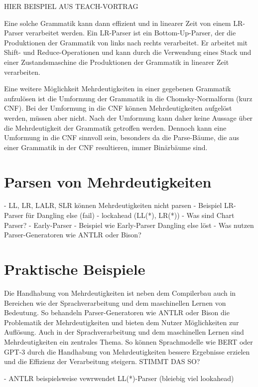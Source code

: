 \documentclass[runningheads]{llncs}
\begin{document}
	HIER BEISPIEL AUS TEACH-VORTRAG

	Eine solche Grammatik kann dann effizient und in linearer Zeit von einem LR-Parser verarbeitet werden.
	Ein LR-Parser ist ein Bottom-Up-Parser, der die Produktionen der Grammatik von links nach rechts verarbeitet.
	Er arbeitet mit Shift- und Reduce-Operationen und kann durch die Verwendung eines Stack und einer Zustandsmaschine
	die Produktionen der Grammatik in linearer Zeit verarbeiten.

	Eine weitere Möglichkeit Mehrdeutigkeiten in einer gegebenen Grammatik aufzulösen
	ist die Umformung der Grammatik in die Chomsky-Normalform (kurz CNF).
	Bei der Umformung in die CNF können Mehrdeutigkeiten aufgelöst werden, müssen aber nicht.
	Nach der Umformung kann daher keine Aussage über die Mehrdeutigkeit der Grammatik getroffen werden.
	Dennoch kann eine Umformung in die CNF sinnvoll sein, besonders da die Parse-Bäume,
	die aus einer Grammatik in der CNF resultieren, immer Binärbäume sind.

	\section{Parsen von Mehrdeutigkeiten}\label{sec:parsen-von-mehrdeutigkeiten}

	- LL, LR, LALR, SLR können Mehrdeutigkeiten nicht parsen
	- Beispiel LR-Parser für Dangling else (fail)
	- lockahead (LL(*), LR(*))
	- Was sind Chart Parser?
	- Early-Parser
	- Beispiel wie Early-Parser Dangling else löst
	- Was nutzen Parser-Generatoren wie ANTLR oder Bison?

	\section{Praktische Beispiele}\label{sec:praktische-beispiele}

	Die Handhabung von Mehrdeutigkeiten ist neben dem Compilerbau
	auch in Bereichen wie der Sprachverarbeitung und dem maschinellen Lernen von Bedeutung.
	So behandeln Parser-Generatoren wie ANTLR oder Bison die Problematik der Mehrdeutigkeiten
	und bieten dem Nutzer Möglichkeiten zur Auflösung.
	Auch in der Sprachverarbeitung und dem maschinellen Lernen sind Mehrdeutigkeiten ein zentrales Thema.
	So können Sprachmodelle wie BERT oder GPT-3 durch die Handhabung von Mehrdeutigkeiten
	bessere Ergebnisse erzielen und die Effizienz der Verarbeitung steigern.
	STIMMT DAS SO?

	- ANTLR beispielsweise vewrwendet LL(*)-Parser (bleiebig viel lookahead)
\end{document}

